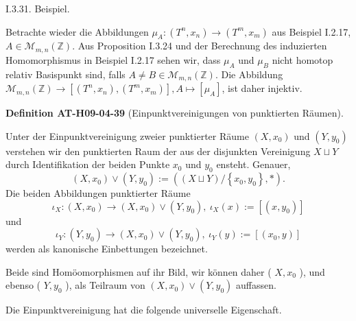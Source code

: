\documentclass[10pt, letterpaper]{article}
\newcommand{\CustomHeading}[3]{%
  \par\medskip\noindent%
  \textbf{#1 #2} \textnormal{(#3)}.\enskip%
}
\newenvironment{DEF}[2]{\begin{unitbox}\CustomHeading{Definition}{#1}{#2}}{\end{unitbox}}
\begin{document}
I.3.31. Beispiel. 

Betrachte wieder die Abbildungen $\mu_{A}:\left(T^{n}, x_{n}\right) \rightarrow\left(T^{m}, x_{m}\right)$ aus Beispiel I.2.17, $A \in \mathcal{M}_{m, n}(\mathbb{Z})$. Aus Proposition I.3.24 und der Berechnung des induzierten Homomorphismus in Beispiel I.2.17 sehen wir, dass $\mu_{A}$ und $\mu_{B}$ nicht homotop relativ Basispunkt sind, falls $A \neq B \in \mathcal{M}_{m, n}(\mathbb{Z})$. Die Abbildung $\mathcal{M}_{m, n}(\mathbb{Z}) \rightarrow\left[\left(T^{n}, x_{n}\right),\left(T^{m}, x_{m}\right)\right], A \mapsto\left[\mu_{A}\right]$, ist daher injektiv.




\begin{DEF}{AT-H09-04-39}{Einpunktvereinigungen von punktierten Räumen}
Unter der Einpunktvereinigung zweier punktierter Räume $(X, x_{0})$ und $(Y, y_{0})$ verstehen wir den punktierten Raum der aus der disjunkten Vereinigung $X \sqcup Y$ durch Identifikation der beiden Punkte $x_{0}$ und $y_{0}$ ensteht. Genauer,
$$
\left(X, x_{0}\right) \vee\left(Y, y_{0}\right):=\left((X \sqcup Y) /\left\{x_{0}, y_{0}\right\}, *\right) .
$$
Die beiden Abbildungen punktierter Räume 
$$\iota_{X}:\left(X, x_{0}\right) \rightarrow\left(X, x_{0}\right) \vee\left(Y, y_{0}\right),\ \iota_{X}(x):=\left[\left(x, y_{0}\right)\right]$$ 
und 
$$\iota_{Y}:\left(Y, y_{0}\right) \rightarrow\left(X, x_{0}\right) \vee\left(Y, y_{0}\right),\ \iota_{Y}(y):=\left[\left(x_{0}, y\right)\right]$$ 
werden als kanonische Einbettungen bezeichnet. 

Beide sind Homöomorphismen auf ihr Bild, wir können daher ( $X, x_{0}$ ), und ebenso ( $Y, y_{0}$ ), als Teilraum von $\left(X, x_{0}\right) \vee\left(Y, y_{0}\right)$ auffassen.
\end{DEF}



Die Einpunktvereinigung hat die folgende universelle Eigenschaft. 
\end{document}
